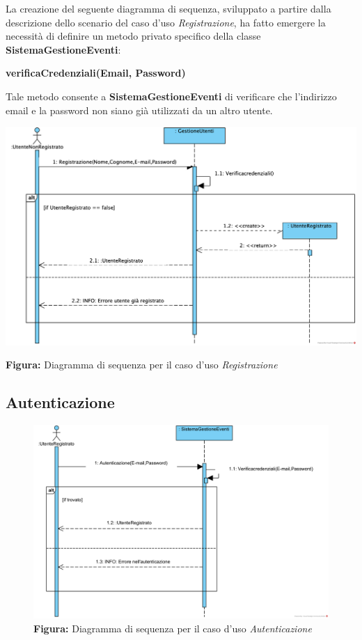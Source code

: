 \begin{center}
    La creazione del seguente diagramma di sequenza, sviluppato a partire dalla descrizione dello scenario del caso d’uso \textit{Registrazione}, ha fatto emergere la necessità di definire un metodo privato specifico della classe \textbf{SistemaGestioneEventi}:

    \vspace{1ex}
    \textbf{verificaCredenziali(Email, Password)}

    \vspace{2ex}
    Tale metodo consente a \textbf{SistemaGestioneEventi} di verificare che l’indirizzo email e la password non siano già utilizzati da un altro utente.

    \vspace{3ex}
    \includegraphics[width=0.8\linewidth]{assets/casid'uso/Registrazione.png}
    
    \vspace{1ex}
    \textbf{Figura:} Diagramma di sequenza per il caso d’uso \textit{Registrazione}
\end{center}

\subsection{Autenticazione}
\begin{figure}[!ht]
    \hspace*{4cm} %
    \includegraphics[width=0.8\linewidth]{assets/casid'uso/Autenticazione.png}
	\vspace{1ex}
    \textbf{Figura:} Diagramma di sequenza per il caso d’uso \textit{Autenticazione}
\end{figure}

